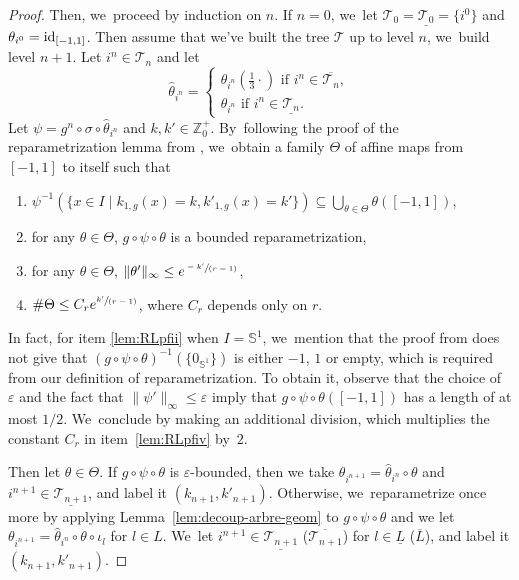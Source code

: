 \documentclass[JEP,XML,SOM,Unicode,NoFloatCountersInSection,published]{cedram}
\newenvironment{enumeratei}
{\bgroup\def\theenumi{\roman{enumi}}\def\theenumii{\arabic{enumii}}\begin{enumerate}}
{\end{enumerate}\egroup}
\newcommand{\spfrac}[2]{\sfrac{#1}{(#2)}}
\newcommand{\id}{\textup{id}}
\theoremstyle{definition}
\newcommand{\bbS}{{\mathbb{S}}}
\newcommand{\bbZ}{{\mathbb{Z}}}
\begin{document}
\begin{proof}
Then, we~proceed by induction on $n$.
If $n=0$, we~let $\mathcal{T}_0 = \underline{\mathcal{T}_0} = \{ i^0 \}$ and $\theta_{i^0} = \id_{[-1, 1]}$.
Then assume that we've built the tree $\mathcal{T}$ up to level $n$, we~build level $n+1$.
Let $i^n \in \mathcal{T}_n$ and let
\[
\hat{\theta}_{i^n} = \begin{cases}
\theta_{i^n} \left (\frac{1}{3} \cdot \right) \text{ if } i^n \in \overline{\mathcal{T}_n},\\
\theta_{i^n} \text{ if } i^n \in \underline{\mathcal{T}_n}.
\end{cases}
\]
Let $\psi = g^n \circ \sigma \circ \hat{\theta}_{i^n}$ and $k,k' \in \bbZ_0^+$. By~following the proof of the reparametrization lemma from \cite{MR4701884}, we~obtain a family $\Theta$ of affine maps from $[-1,1]$ to itself such that
\begin{enumeratei}
\item\label{lem:RLpfi}
$\psi^{-1} \left (\{ x \in I \mid k_{1,g}(x)=k, k'_{1,g}(x)=k'\} \right)\subseteq \bigcup_{\theta\in \Theta} \theta([-1,1])$,
\item\label{lem:RLpfii}
for any $\theta \in \Theta$, $g \circ \psi \circ \theta$ is a bounded reparametrization,
\item\label{lem:RLpfiii}
for any $\theta \in \Theta$, $\| \theta' \|_{\infty}\leq e^{\spfrac{-k'}{r-1}}$,
\item\label{lem:RLpfiv}
$\# \Theta\leq C_r e^{\spfrac{k'}{r-1}}$, where $C_r$ depends only on $r$.
\end{enumeratei}
In fact, for item \eqref{lem:RLpfii} when $I = \bbS^1$, we~mention that the proof from \cite{MR4701884} does not give that $(g \circ \psi \circ \theta)^{-1} (\{ 0_{\bbS^1} \})$ is either $-1$, $1$ or empty, which is required from our definition of reparametrization.
To obtain it, observe that the choice of $\varepsilon$ and the fact that $\| \psi' \|_{\infty} \leq \varepsilon$ imply that $g \circ \psi \circ \theta([-1,1])$ has a length of at most $1/2$. We~conclude by making an additional division, which multiplies the constant $C_r$ in item~\eqref{lem:RLpfiv} by~$2$.

Then let $\theta \in \Theta$. If $g \circ \psi \circ \theta$ is $\varepsilon$-bounded, then we take $\theta_{i^{n+1}} = \hat{\theta}_{i^n} \circ \theta$ and $i^{n+1} \in \underline{\mathcal{T}_{n+1}}$, and label it $(k_{n+1},k'_{n+1})$.
Otherwise, we~reparametrize once more by applying Lemma~\ref{lem:decoup-arbre-geom} to $g \circ \psi \circ \theta$ and we let $\theta_{i^{n+1}} = \hat{\theta}_{i^n} \circ \theta \circ \iota_l$ for $l \in L$. We~let $i^{n+1} \in \underline{\mathcal{T}_{n+1}}$ (\resp $\overline{\mathcal{T}_{n+1}}$) for $l \in \underline{L}$ (\resp $\overline{L}$), and label it $(k_{n+1},k'_{n+1})$.


\end{proof}
\end{document}
